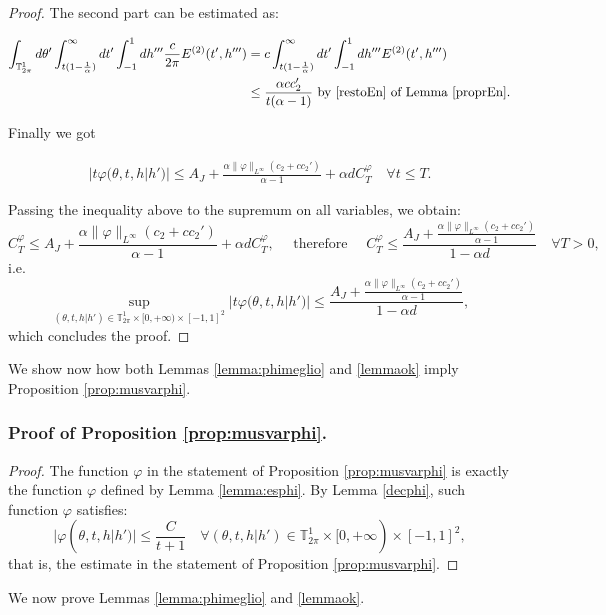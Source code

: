 \documentclass[a4paper,10pt,reqno]{amsart}
\numberwithin{equation}{subsection}
\numberwithin{figure}{subsection}
\begin{document}
\begin{proof}
The second part can be estimated as:

\begin{align*}
\int_{\mathbb{T}^1_{2\pi}}d\theta'\int_{t(1-\frac{1}{\alpha})}^{\infty}dt'\int_{-1}^1dh'''\frac{c}{2\pi}E^{(2)}(t',h''')&=c\int_{t(1-\frac{1}{\alpha})}^{\infty}dt'\int_{-1}^1dh'''E^{(2)}(t',h''')
\\
&\leq\frac{\alpha cc_2'}{t(\alpha-1)}\textrm{ by }\eqref{restoEn}\textrm{ of Lemma \ref{proprEn}}.
\end{align*}

Finally we got

\begin{align*}
|t\varphi(\theta,t,h|h')|\leq A_J+\frac{\alpha\|\varphi\|_{L^{\infty}}(c_2+cc_2')}{\alpha-1}+\alpha dC_T^{\varphi}\quad\forall t\leq T.
\end{align*}

Passing the inequality above to the supremum on all variables, we obtain:
{\footnotesize\[
C_T^{\varphi}\leq A_J+\frac{\alpha\|\varphi\|_{L^{\infty}}(c_2+cc_2')}{\alpha-1}+\alpha dC_T^{\varphi},\quad\textrm{ therefore }\quad C_T^{\varphi}\leq\frac{A_J+\frac{\alpha\|\varphi\|_{L^{\infty}}(c_2+cc_2')}{\alpha-1}}{1-\alpha d}\quad\forall T>0,
\]}
i.e.
\[
\sup_{(\theta,t,h|h')\in\mathbb{T}^1_{2\pi}\times[0,+\infty)\times[-1,1]^2}|t\varphi(\theta,t,h|h')|\leq\frac{A_J+\frac{\alpha\|\varphi\|_{L^{\infty}}(c_2+cc_2')}{\alpha-1}}{1-\alpha d},
\]
which concludes the proof.
\end{proof}
We show now how both Lemmas \ref{lemma:phimeglio} and \ref{lemmaok} imply Proposition \ref{prop:musvarphi}.
\newline
\subsubsection{Proof of Proposition \ref{prop:musvarphi}.}
\begin{proof}
The function $\varphi$ in the statement of Proposition \ref{prop:musvarphi} is exactly the function $\varphi$ defined by Lemma \ref{lemma:esphi}. By Lemma \ref{decphi}, such function $\varphi$ satisfies:
\[
|\varphi(\theta,t,h|h')|\leq\frac{C}{t+1}\quad\forall(\theta,t,h|h')\in\mathbb{T}^1_{2\pi}\times[0,+\infty)\times[-1,1]^2,
\]
that is, the estimate in the statement of Proposition \ref{prop:musvarphi}.
\end{proof}

We now prove Lemmas \ref{lemma:phimeglio} and \ref{lemmaok}.
\newline
\end{document}
